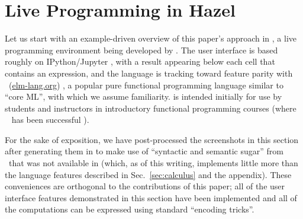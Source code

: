 \newcommand{\examplesSec}{Live Programming in Hazel}
\section{\examplesSec} 
\label{sec:examples}




\newcommand{\overviewExample}[2]{\paragraph{Example {#1}: {#2}}}

Let us start with an example-driven overview of this paper's approach in \Hazel, a live programming environment being developed by \citet{HazelnutSNAPL}. The \Hazel user interface is based roughly on IPython/Jupyter \cite{PER-GRA:2007}, with a result appearing below each cell that contains an expression, and the \Hazel language is tracking toward feature parity with \Elm~(\url{elm-lang.org}) \cite{czaplicki2012elm,Elm}, a popular pure functional programming language similar to ``core ML'', with which we assume familiarity. \Hazel is intended initially for use by students and instructors in introductory functional programming courses (where \Elm~ has been successful \cite{DBLP:journals/corr/abs-1805-05125,zhang2018graphics}). 

For the sake of 
exposition, we have post-processed the screenshots in this section after generating them in \Hazel to make use of  ``syntactic and semantic sugar'' from \Elm~that was not available in \Hazel (which, as of this writing, implements little more than the language features described in Sec.~\ref{sec:calculus} and the appendix). These conveniences are orthogonal to the contributions of this paper; all of the user interface features demonstrated in this section have been implemented and all of the computations can be expressed using standard ``encoding tricks''.







